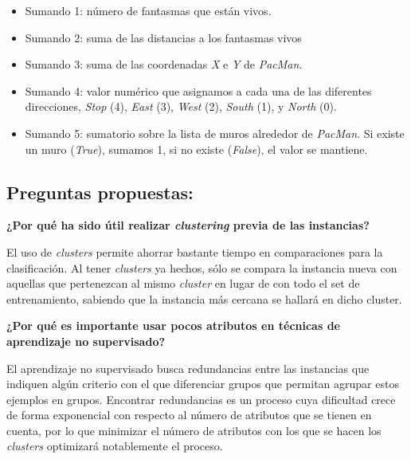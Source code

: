 \documentclass[12pt]{article}
\begin{document}
\begin{itemize}
    \item Sumando 1: número de fantasmas que están vivos.
    \item Sumando 2: suma de las distancias a los fantasmas vivos
    \item Sumando 3: suma de las coordenadas \textit{X} e \textit{Y} de \textit{PacMan}.
    \item Sumando 4: valor numérico que asignamos a cada una de las diferentes direcciones, \textit{Stop} (4), \textit{East} (3), \textit{West} (2), \textit{South} (1), y \textit{North} (0).
    \item Sumando 5: sumatorio sobre la lista de muros alrededor de \textit{PacMan}. Si existe un muro (\textit{True}), sumamos 1, si no existe (\textit{False}), el valor se mantiene.
\end{itemize}

\newpage
\subsection{Preguntas propuestas:}

\vspace{0.5cm}
\begin{center}
    \textbf{¿Por qué ha sido útil realizar \textit{clustering} previa de las instancias?}
\end{center}
\vspace{0.5cm}

El uso de \textit{clusters} permite ahorrar bastante tiempo en comparaciones para la clasificación. Al tener \textit{clusters} ya hechos, sólo se compara la instancia nueva con aquellas que pertenezcan al mismo \textit{cluster} en lugar de con todo el set de entrenamiento, sabiendo que la instancia más cercana se hallará en dicho cluster.

\vspace{0.5cm}
\begin{center}
    \textbf{¿Por qué es importante usar pocos atributos en técnicas de aprendizaje no supervisado?}
\end{center}
\vspace{0.5cm}

El aprendizaje no supervisado busca redundancias entre las instancias que indiquen algún criterio con el que diferenciar grupos que permitan agrupar estos ejemplos en grupos. Encontrar redundancias es un proceso cuya dificultad crece de forma exponencial con respecto al número de atributos que se tienen en cuenta, por lo que minimizar el número de atributos con los que se hacen los \textit{clusters} optimizará notablemente el proceso.
\end{document}
